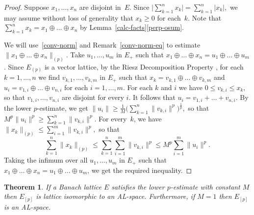 \documentclass[12pt]{amsart}
\theoremstyle{plain}
\newtheorem{theorem}{Theorem}
\theoremstyle{definition}
\newcommand{\abs}[1]{\lvert#1\rvert}
\newcommand{\norm}[1]{\lVert#1\rVert}
\newcommand{\bigabs}[1]{\bigl\lvert#1\bigr\rvert}
\newcommand{\bignorm}[1]{\bigl\lVert#1\bigr\rVert}
\renewcommand{\le}{\leqslant}
\renewcommand{\ge}{\geqslant}
\begin{document}
\begin{proof}
  Suppose $x_1,\dots,x_n$ are disjoint in~$E$.
  Since
  \begin{math}
    \bigabs{\sum_{k=1}^nx_k}
    =\sum_{k=1}^n\abs{x_k},
  \end{math}
  we may assume without loss of generality that $x_k\ge 0$ for each~$k$.
  Note that
  \begin{math}
    \sum_{k=1}^nx_k
    =x_1\oplus\dots\oplus x_n
  \end{math}
  by Lemma~\ref{calc-facts}\eqref{perp-osum}.

  We will use~\eqref{conv-norm} and Remark~\ref{conv-norm-eq} to
  estimate $\bignorm{x_1\oplus\dots\oplus x_n}_{(p)}$.  Take
  $u_1,\dots,u_m$ in $E_+$ such that $x_1\oplus\dots\oplus
  x_n=u_1\oplus\dots\oplus u_m$. Since $E_{(p)}$ is a vector lattice,
  by the Riesz Decomposition Property \cite[Theorem~1.20]{Aliprantis:06},
  for each $k=1,\dots,n$ we find $v_{k,1},\dots,v_{k,m}$ in $E_+$ such
  that $x_k=v_{k,1}\oplus\dots\oplus v_{k,m}$ and
  $u_i=v_{1,i}\oplus\dots\oplus v_{n,i}$ for each $i=1,\dots,m$. For
  each $k$ and $i$ we have $0\le v_{k,i}\le x_k$, so that
  $v_{1,i},\dots,v_{n,i}$ are disjoint for every $i$. It follows that
  $u_i=v_{1,i}+\dots+ v_{n,i}$. By the lower $p$-estimate, we get
  \begin{math}
    \norm{u_i}
    \ge\frac{1}{M}\bigl(\sum_{k=1}^n\norm{v_{k,i}}^p)^{\frac{1}{p}},
  \end{math}
  so that
  \begin{math}
    M^p\norm{u_i}^p
    \ge\sum_{k=1}^n\norm{v_{k,i}}^p.
  \end{math}
  For every~$k$, we have
  \begin{math}
    \norm{x_k}_{(p)}\le\sum_{i=1}^m\norm{v_{k,i}}^p,    
  \end{math}
  so that
  \begin{displaymath}
    \sum_{k=1}^n\norm{x_k}_{(p)}
    \le\sum_{k=1}^n\sum_{i=1}^m\norm{v_{k,i}}^p
    \le M^p\sum_{i=1}^m\norm{u_i}^p.
  \end{displaymath}
  Taking the infimum over all $u_1,\dots,u_m$ in $E_+$ such that $x_1\oplus\dots\oplus
  x_n=u_1\oplus\dots\oplus u_m$, we get the required inequality.
\end{proof}

\begin{theorem}\label{p-est-AL}
  If a Banach lattice $E$ satisfies the lower $p$-estimate with constant
  $M$ then $E_{[p]}$ is lattice isomorphic to an
  AL-space. Furthermore, if $M=1$ then $E_{[p]}$ is an AL-space.
\end{theorem}
\end{document}
